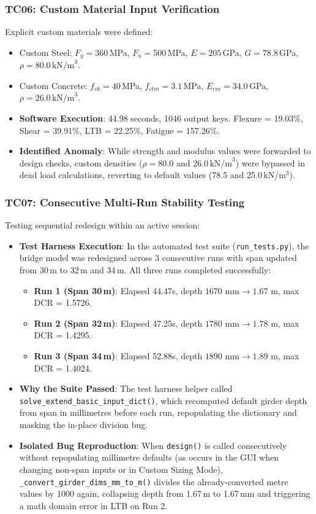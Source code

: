 \documentclass[11pt,a4paper]{article}
\begin{document}
\subsubsection{TC06: Custom Material Input Verification}
Explicit custom materials were defined:
\begin{itemize}
    \item Custom Steel: $F_y = 360$\,MPa, $F_u = 500$\,MPa, $E = 205$\,GPa, $G = 78.8$\,GPa, $\rho = 80.0\,\text{kN/m}^3$.
    \item Custom Concrete: $f_{ck} = 40$\,MPa, $f_{ctm} = 3.1$\,MPa, $E_{cm} = 34.0$\,GPa, $\rho = 26.0\,\text{kN/m}^3$.
    \item \textbf{Software Execution}: 44.98 seconds, 1046 output keys. Flexure = 19.03\%, Shear = 39.91\%, LTB = 22.25\%, Fatigue = 157.26\%.
    \item \textbf{Identified Anomaly}: While strength and modulus values were forwarded to design checks, custom densities ($\rho = 80.0$ and $26.0\,\text{kN/m}^3$) were bypassed in dead load calculations, reverting to default values (78.5 and 25.0\,kN/m$^3$).
\end{itemize}

\subsubsection{TC07: Consecutive Multi-Run Stability Testing}
Testing sequential redesign within an active session:
\begin{itemize}
    \item \textbf{Test Harness Execution}: In the automated test suite (\texttt{run\_tests.py}), the bridge model was redesigned across 3 consecutive runs with span updated from 30\,m to 32\,m and 34\,m. All three runs completed successfully:
    \begin{itemize}
        \item \textbf{Run 1 (Span 30\,m)}: Elapsed 44.47s, depth $1670\text{ mm} \to 1.67\text{ m}$, max DCR = 1.5726.
        \item \textbf{Run 2 (Span 32\,m)}: Elapsed 47.25s, depth $1780\text{ mm} \to 1.78\text{ m}$, max DCR = 1.4295.
        \item \textbf{Run 3 (Span 34\,m)}: Elapsed 52.88s, depth $1890\text{ mm} \to 1.89\text{ m}$, max DCR = 1.4024.
    \end{itemize}
    \item \textbf{Why the Suite Passed}: The test harness helper called \texttt{solve\_extend\_basic\_input\_dict()}, which recomputed default girder depth from span in millimetres before each run, repopulating the dictionary and masking the in-place division bug.
    \item \textbf{Isolated Bug Reproduction}: When \texttt{design()} is called consecutively without repopulating millimetre defaults (as occurs in the GUI when changing non-span inputs or in Custom Sizing Mode), \texttt{\_convert\_girder\_dims\_mm\_to\_m()} divides the already-converted metre values by 1000 again, collapsing depth from 1.67\,m to 1.67\,mm and triggering a math domain error in LTB on Run 2.
\end{itemize}
\end{document}
